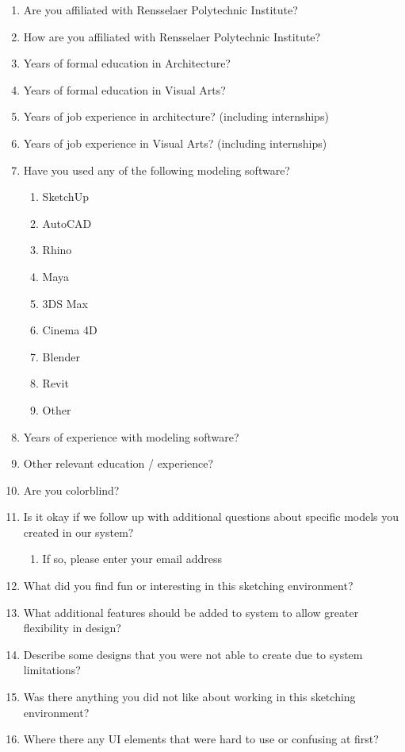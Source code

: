 \documentclass[12pt]{article}
\begin{document}
\begin{enumerate}  
        \item Are you affiliated with Rensselaer Polytechnic Institute? 
        \item How are you affiliated with Rensselaer Polytechnic Institute?
        \item Years of formal education in Architecture?
        \item Years of formal education in Visual Arts?
        \item Years of job experience in architecture? (including internships) 
        \item Years of job experience in Visual Arts? (including internships)
        \item Have you used any of the following modeling software?
        \begin{enumerate}  
          \item SketchUp
          \item AutoCAD
          \item Rhino
          \item Maya
          \item 3DS Max
          \item Cinema 4D
          \item Blender
          \item Revit
          \item Other
        \end{enumerate}
        \item Years of experience with modeling software?
        \item Other relevant education / experience?
        \item Are you colorblind?
        \item Is it okay if we follow up with additional questions about specific models you created in our system?
          \begin{enumerate}
            \item If so, please enter your email address
          \end{enumerate}

    \item What did you find fun or interesting in this sketching environment?
    \item What additional features should be added to system to allow greater flexibility in design?
    \item Describe some designs that you were not able to create due  to system limitations?
    \item Was there anything you did not like about working in this sketching environment?
    \item Where there any UI elements that were hard to use or confusing at first?


\end{enumerate}
\end{document}
